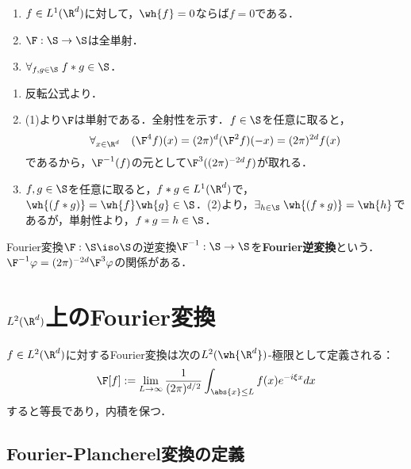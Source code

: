 \documentclass[uplatex,dvipdfmx]{jsreport}
\begin{document}
\begin{corollary}[$\S$上の全単射性と畳み込みに対する閉性]\mbox{}\label{cor-Fourier-transform-is-bijection-on-S}
    \begin{enumerate}
        \item $f\in L^1(\R^d)$に対して，$\wh{f}=0$ならば$f=0$である．
        \item $\F:\S\to\S$は全単射．
        \item $\forall_{f,g\in\S}\;f*g\in\S$．
    \end{enumerate}
\end{corollary}
\begin{Proof}\mbox{}
    \begin{enumerate}
        \item 反転公式より．
        \item (1)より$\F$は単射である．全射性を示す．$f\in\S$を任意に取ると，
        \[\forall_{x\in\R^d}\quad(\F^4f)(x)=(2\pi)^d(\F^2f)(-x)=(2\pi)^{2d}f(x)\]
        であるから，$\F^{-1}(f)$の元として$\F^3((2\pi)^{-2d}f)$が取れる．
        \item $f,g\in\S$を任意に取ると，$f*g\in L^1(\R^d)$で，$\wh{(f*g)}=\wh{f}\wh{g}\in\S$．(2)より，$\exists_{h\in\S}\;\wh{(f*g)}=\wh{h}$であるが，単射性より，$f*g=h\in\S$．
    \end{enumerate}
\end{Proof}

\begin{definition}
    Fourier変換$\F:\S\iso\S$の逆変換$\F^{-1}:\S\to\S$を\textbf{Fourier逆変換}という．
    $\F^{-1}\varphi=(2\pi)^{-2d}\F^3\varphi$の関係がある．
\end{definition}

\section{$L^2(\R^d)$上のFourier変換}

\begin{tcolorbox}[colframe=ForestGreen, colback=ForestGreen!10!white,breakable,colbacktitle=ForestGreen!40!white,coltitle=black,fonttitle=\bfseries\sffamily,
title=]
    $f\in L^2(\R^d)$に対するFourier変換は次の$L^2(\wh{\R^d})$-極限として定義される：
    \[\F[f]:=\lim_{L\to\infty}\frac{1}{(2\pi)^{d/2}}\int_{\abs{x}\le L}f(x)e^{-i\xi x}dx\]
    すると等長であり，内積を保つ．
\end{tcolorbox}

\subsection{Fourier-Plancherel変換の定義}
\end{document}
